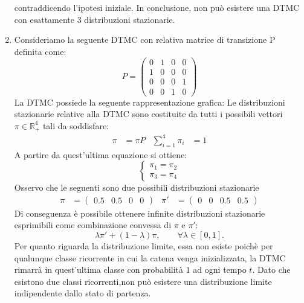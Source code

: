 \documentclass[
	12pt, %
]{fphw}
\begin{document}
\begin{enumerate}
	contraddicendo l'ipotesi iniziale.
	In conclusione, non può esistere una DTMC con esattamente $3$ distribuzioni stazionarie.
	\item Consideriamo la seguente DTMC con relativa matrice di transizione P definita come:
	\begin{equation*}
		P = \begin{pmatrix}
			0 & 1 & 0 & 0\\
			1 & 0 & 0 & 0\\
			0 & 0 & 0 & 1\\
			0 & 0 & 1 & 0
		\end{pmatrix}
	\end{equation*}
	La DTMC possiede la seguente rappresentazione grafica:
	Le distribuzioni stazionarie relative alla DTMC sono costituite da tutti i possibili vettori $\pi \in \mathbb{R}_+ ^4$ tali da soddisfare:
	\begin{align*}
	\pi &= \pi P & \sum_{i = 1}^{4} \pi_i &= 1 
	\end{align*}
	A partire da quest'ultima equazione si ottiene:
	\begin{equation*}
		\begin{cases} 
			\pi_1 = \pi_2\\
			\pi_3 = \pi_4
		\end{cases}
	\end{equation*}
	Osservo che le seguenti sono due possibili distribuzioni stazionarie
	\begin{align*}
		\pi &= \begin{pmatrix}
			0.5 & 0.5 & 0 & 0 
		\end{pmatrix} & 
		\pi' &= \begin{pmatrix}
			0 & 0 & 0.5 & 0.5 
		\end{pmatrix}
	\end{align*}
	Di conseguenza è possibile ottenere infinite distribuzioni stazionarie
	esprimibili come combinazione convessa di $\pi$ e $\pi'$:
	\begin{equation*}
		\lambda \pi' + (1-\lambda ) \pi, \qquad \forall \lambda \in [0,1].
	\end{equation*}
	Per quanto riguarda la distribuzione limite, essa non esiste poichè per qualunque classe ricorrente
	in cui la catena venga inizializzata, la DTMC rimarrà in quest'ultima classe con probabilità $1$ ad ogni tempo $t$.
	Dato che esistono due classi ricorrenti,non può esistere una distribuzione limite indipendente dallo stato di partenza.


\end{enumerate}
\end{document}
